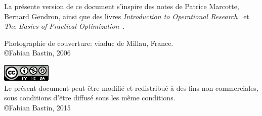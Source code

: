 \documentclass[11pt]{book}%
\theoremstyle{plain}
\numberwithin{equation}{section}
\begin{document}
\noindent
\small
La présente version de ce document s'inspire des notes de Patrice Marcotte, Bernard Gendron, ainsi que des livres {\sl Introduction to Operational Research}~\cite{HillLieb01} et {\sl The Basics of Practical Optimization}~\cite{Levy09}.


{
\noindent
\footnotesize{Photographie de couverture: viaduc de Millau, France.\\
\copyright Fabian Bastin, 2006}
}


\noindent
\includegraphics{cc.png}\\
Le présent document peut être modifié et redistribué à des fins non commerciales, sous conditions d'être diffusé sous les même conditions.\\
\copyright Fabian Bastin, 2015


\tableofcontents

\mainmatter

















\backmatter



{}
\makeatletter


\makeatother

\end{document}
